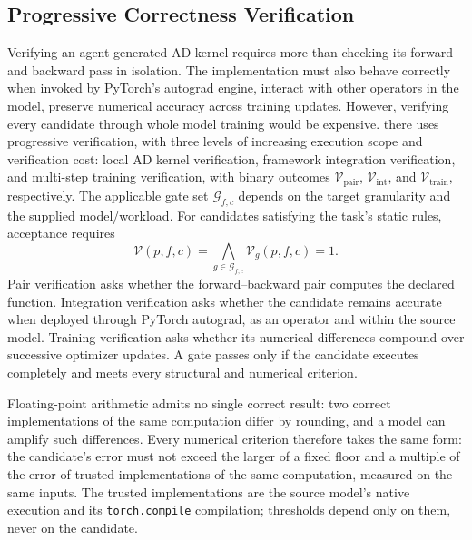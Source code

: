 \subsection{Progressive Correctness Verification}
\label{sec:verification_protocol}

Verifying an agent-generated AD kernel requires more than checking its forward and backward pass in isolation. The implementation must also behave correctly when invoked by PyTorch's autograd engine, interact with other operators in the model, preserve numerical accuracy across training updates. However, verifying every candidate through whole model training would be expensive. \system there uses progressive verification, with three levels of increasing execution scope and verification cost:
local AD kernel verification, framework integration verification, and multi-step training verification,
with binary outcomes $\mathcal{V}_{\mathrm{pair}}$, $\mathcal{V}_{\mathrm{int}}$, and $\mathcal{V}_{\mathrm{train}}$, respectively.
The applicable gate set $\mathcal{G}_{f,c}$ depends on the target granularity and the supplied model/workload. For candidates satisfying the task's static rules, acceptance requires
\begin{equation}
    \mathcal{V}(p,f,c)
    =
    \bigwedge_{g\in\mathcal{G}_{f,c}}
    \mathcal{V}_g(p,f,c)
    =1.
    \label{eq:validity}
\end{equation}
Pair verification asks whether the forward--backward pair computes the declared function. Integration verification asks whether the candidate remains accurate when deployed through PyTorch autograd, as an operator and within the source model. Training verification asks whether its numerical differences compound over successive optimizer updates. A gate passes only if the candidate executes completely and meets every structural and numerical criterion.

Floating-point arithmetic admits no single correct result: two correct implementations of the same computation differ by rounding, and a model can amplify such differences. Every numerical criterion therefore takes the same form: the candidate's error must not exceed the larger of a fixed floor and a multiple of the error of trusted implementations of the same computation, measured on the same inputs. The trusted implementations are the source model's native execution and its \texttt{torch.compile} compilation; thresholds depend only on them, never on the candidate. 

